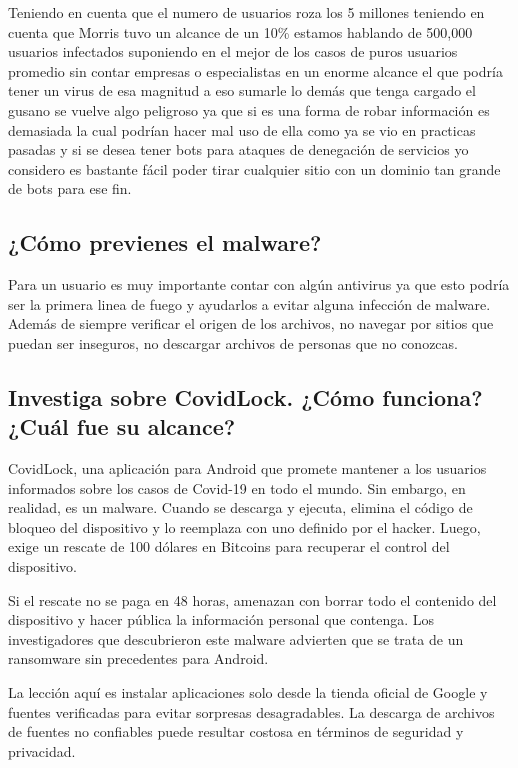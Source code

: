 Teniendo en cuenta que el numero de usuarios roza los 5 millones teniendo en cuenta que Morris tuvo un alcance de un 10\% estamos hablando de 500,000 usuarios infectados suponiendo en el mejor de los casos de puros usuarios promedio sin contar empresas o especialistas en un enorme alcance el que podría tener un virus de esa magnitud a eso sumarle lo demás que tenga cargado el gusano se vuelve algo peligroso ya que si es una forma de robar información es  demasiada la cual podrían hacer mal uso de ella como ya se vio en practicas pasadas y si se desea tener bots para ataques de denegación de servicios yo considero es bastante fácil poder tirar cualquier sitio con un dominio tan grande de bots para ese fin. 

\subsection{¿Cómo previenes el malware?}

Para un usuario es muy importante contar con algún antivirus ya que esto podría ser la primera linea de fuego y ayudarlos a evitar alguna infección de malware. Además  de siempre verificar el origen de los archivos, no navegar por sitios que puedan ser inseguros, no descargar archivos de personas que no conozcas.

\subsection{Investiga sobre CovidLock. ¿Cómo funciona? ¿Cuál fue su alcance?}

CovidLock, una aplicación para Android que promete mantener a los usuarios informados sobre los casos de Covid-19 en todo el mundo. Sin embargo, en realidad, es un malware. Cuando se descarga y ejecuta, elimina el código de bloqueo del dispositivo y lo reemplaza con uno definido por el hacker. Luego, exige un rescate de 100 dólares en Bitcoins para recuperar el control del dispositivo.

Si el rescate no se paga en 48 horas, amenazan con borrar todo el contenido del dispositivo y hacer pública la información personal que contenga. Los investigadores que descubrieron este malware advierten que se trata de un ransomware sin precedentes para Android.

La lección aquí es instalar aplicaciones solo desde la tienda oficial de Google y fuentes verificadas para evitar sorpresas desagradables. La descarga de archivos de fuentes no confiables puede resultar costosa en términos de seguridad y privacidad.


